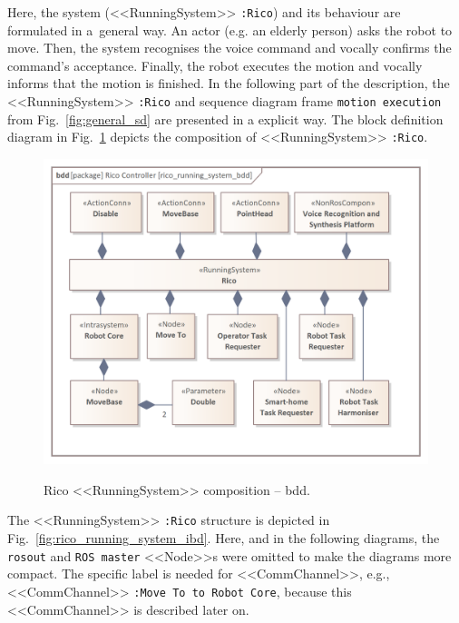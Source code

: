 \documentclass{ieeeaccess}
\begin{document}
	Here, the system (<<RunningSystem>> \texttt{:Rico}) and its behaviour are formulated in a~general way. An actor (e.g. an elderly person) asks the robot to move. Then, the system recognises the voice command and vocally confirms the command's acceptance. Finally, the robot executes the motion and vocally informs that the motion is finished.
	In the following part of the description, the <<RunningSystem>> \texttt{:Rico} and sequence diagram frame \texttt{motion execution} from Fig.~\ref{fig:general_sd} are presented in a explicit way.
	The block definition diagram in Fig.~\ref{fig:rico_running_system_bdd} depicts the composition of <<RunningSystem>> \texttt{:Rico}.
	
	\begin{figure}[htb]
		\centering
		\begin{center}
			{\includegraphics[scale=0.7]{img/rico_pkg/rico_running_system_bdd.png}}
		\end{center}
		\caption{Rico <<RunningSystem>> composition -- bdd.}
		\label{fig:rico_running_system_bdd}
	\end{figure}
	
	The <<RunningSystem>> \texttt{:Rico} structure is depicted in Fig.~\ref{fig:rico_running_system_ibd}. Here, and in the following diagrams, the \texttt{rosout} and \texttt{ROS master} <<Node>>s were omitted to make the diagrams more compact. The specific label is needed for <<CommChannel>>, e.g., <<CommChannel>> \texttt{:Move To to Robot Core}, because this <<CommChannel>> is described later on.
	
\end{document}
